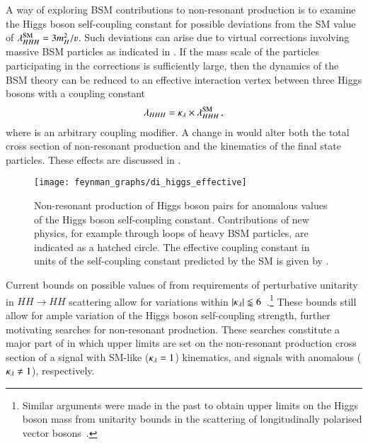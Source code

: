 A way of exploring BSM contributions to non-resonant \HH production is to
examine the Higgs boson self-coupling constant for possible deviations from the
SM value of $\lambda_{HHH}^\text{SM} = 3 m_{H}^2 / \varv$. Such deviations can
arise due to virtual corrections involving massive BSM particles as indicated in
. If the mass scale of the particles participating in
the corrections is sufficiently large, then the dynamics of the BSM theory can
be reduced to an effective interaction vertex between three Higgs bosons with a
coupling constant
\begin{align*}
  \lambda_{HHH} = \kappa_{\lambda} \times \lambda_{HHH}^{\text{SM}} \,\text{,}
\end{align*}
where \klambda is an arbitrary coupling modifier. A change in \klambda would
alter both the total cross section of non-resonant \HH production and the
kinematics of the final state particles. These effects are discussed in
.

\begin{figure}[htbp]
  \centering

  \texttt{[image: feynman\_graphs/di\_higgs\_effective]}

  \caption[Feynman diagram of non-resonant \HH production with anomalous values
  of the Higgs boson self-coupling.]{Non-resonant production of Higgs boson
    pairs for anomalous values of the Higgs boson self-coupling constant.
    Contributions of new physics, for example through loops of heavy BSM
    particles, are indicated as a hatched circle. The effective coupling
    constant in units of the self-coupling constant predicted by the SM is given
    by \klambda.}%
  \label{fig:bsm_hh_prod_feyn}
\end{figure}

%
Current bounds on possible values of \klambda from requirements of perturbative
unitarity in $HH \to HH$ scattering allow for variations within
$|\kappa_{\lambda}| \lessapprox 6$~\cite{DiLuzio:2017tfn}.\footnote{Similar arguments
  were made in the past to obtain upper limits on the Higgs boson mass from
  unitarity bounds in the scattering of longitudinally polarised vector
  bosons~\cite{Lee:1977eg}.} These bounds still allow for ample variation of the
Higgs boson self-coupling strength, further motivating searches for non-resonant
\HH production. These searches constitute a major part of
 in which upper limits are set on the
non-resonant \HH production cross section of a signal with SM-like
($\kappa_{\lambda} = 1$) kinematics, and signals with anomalous \klambda
($\kappa_{\lambda} \neq 1$), respectively.

